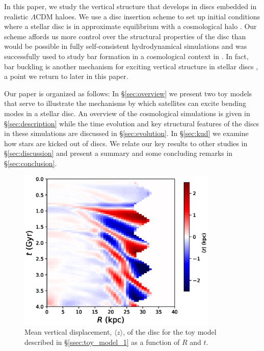 In this paper, we study the vertical structure that develops in discs
embedded in realistic $\Lambda$CDM haloes. We use a disc insertion
scheme to set up initial conditions where a stellar disc is in
approximate equilibrium with a cosmological halo
\citep{berentzen_2006, debuhr_2012, ys_2015, bauer2018a, hu_2018}. Our
scheme affords us more control over the structural properties of the
disc than would be possible in fully self-consistent hydrodynamical
simulations and was successfully used to study bar formation in a
cosmological context in \citet{bauer2018b}. In fact, bar buckling is
another mechanism for exciting vertical structure in stellar discs
\citep{bar_buckling_echo}, a point we return to later in this paper.

Our paper is organized as follows: In \S\ref{sec:overview} we present
two toy models that serve to illustrate the mechanisms by which
satellites can excite bending modes in a stellar disc. An overview of
the cosmological simulations is given in \S\ref{sec:description} while
the time evolution and key structural features of the discs in these
simulations are discussed in \S \ref{sec:evolution}. In \S\ref{sec:kud}
we examine how stars are kicked out of discs.  We relate our key
results to other studies in \S\ref{sec:discussion} and present a
summary and some concluding remarks in \S\ref{sec:conclusion}.

\begin{figure}
	\centering
	\includegraphics[width=0.85\textwidth]{../figures/isolated_z_0_r_a.eps}
	\caption{Mean vertical displacement, $\langle z \rangle$, of the disc for the
          toy model described in \S\ref{ssec:toy_model_1} as a
          function of $R$ and $t$.} \label{fig:toy_model_1_mean_height}
\end{figure}

